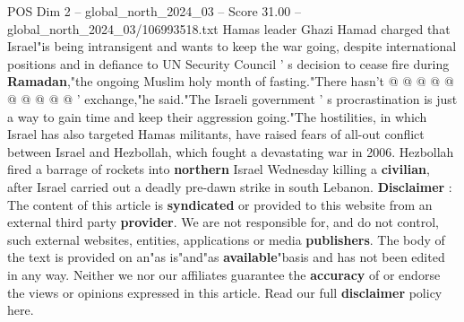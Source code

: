 \begin{textsample}{POS Dim 2 – global\_north\_2024\_03 – Score 31.00 – global\_north\_2024\_03/106993518.txt}
Hamas leader Ghazi Hamad charged that Israel"is being intransigent and wants to keep the war going, despite international positions and in defiance to UN Security Council ' s decision to cease fire during \textbf{Ramadan},"the ongoing Muslim holy month of fasting."There hasn't @ @ @ @ @ @ @ @ @ @ ' exchange,"he said."The Israeli government ' s procrastination is just a way to gain time and keep their aggression going."The hostilities, in which Israel has also targeted Hamas militants, have raised fears of all-out conflict between Israel and Hezbollah, which fought a devastating war in 2006.
Hezbollah fired a barrage of rockets into \textbf{northern} Israel Wednesday killing a \textbf{civilian}, after Israel carried out a deadly pre-dawn strike in south Lebanon. \textbf{Disclaimer} : The content of this article is \textbf{syndicated} or provided to this website from an external third party \textbf{provider}.
We are not responsible for, and do not control, such external websites, entities, applications or media \textbf{publishers}.
The body of the text is provided on an"as is"and"as \textbf{available}"basis and has not been edited in any way.
Neither we nor our affiliates guarantee the \textbf{accuracy} of or endorse the views or opinions expressed in this article.
Read our full \textbf{disclaimer} policy here.

\end{textsample}
